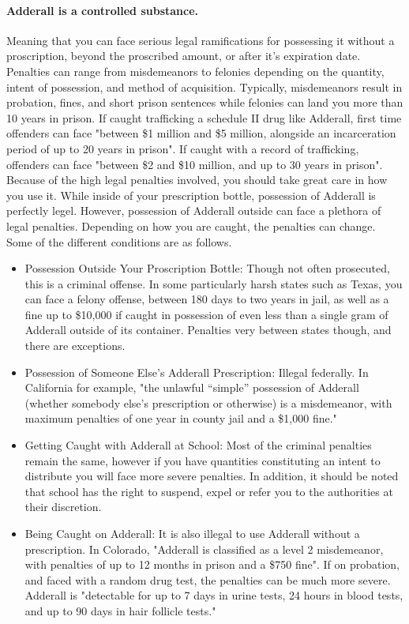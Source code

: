 \documentclass{article}
\begin{document}
                \paragraph{Adderall is a controlled substance.} Meaning that you can face serious legal ramifications for possessing it without a proscription, beyond the proscribed amount, or after it's expiration date. Penalties can range from misdemeanors to felonies depending on the quantity, intent of possession, and method of acquisition. Typically, misdemeanors result in probation, fines, and short prison sentences while felonies can land you more than 10 years in prison. If caught trafficking a schedule II drug like Adderall, first time offenders can face "between \$1 million and \$5 million, alongside an incarceration period of up to 20 years in prison"\cite{hindin22}. If caught with a record of trafficking, offenders can face "between \$2 and \$10 million, and up to 30 years in prison"\cite{hindin22}. Because of the high legal penalties involved, you should take great care in how you use it. 
                While inside of your prescription bottle, possession of Adderall is perfectly legel. However, possession of Adderall outside can face a plethora of legal penalties. Depending on how you are caught, the penalties can change. Some of the different conditions are as follows.
                \begin{itemize}
                    \item Possession Outside Your Proscription Bottle: Though not often prosecuted, this is a criminal offense. In some particularly harsh states such as Texas, you can face a felony offense, between 180 days to two years in jail, as well as a fine up to \$10,000 if caught in possession of even less than a single gram of Adderall outside of its container. Penalties very between states though, and there are exceptions.
                    \item Possession of Someone Else’s Adderall Prescription: Illegal federally. In California for example, "the unlawful “simple” possession of Adderall (whether somebody else’s prescription or otherwise) is a misdemeanor, with maximum penalties of one year in county jail and a \$1,000 fine."\cite{hindin22}
                    \item Getting Caught with Adderall at School: Most of the criminal penalties remain the same, however if you have quantities constituting an intent to distribute you will face more severe penalties. In addition, it should be noted that school has the right to suspend, expel or refer you to the authorities at their discretion.
                    \item Being Caught on Adderall: It is also illegal to use Adderall without a prescription. In Colorado, "Adderall is classified as a level 2 misdemeanor, with penalties of up to 12 months in prison and a \$750 fine"\cite{hindin22}. If on probation, and faced with a random drug test, the penalties can be much more severe. Adderall is "detectable for up to 7 days in urine tests, 24 hours in blood tests, and up to 90 days in hair follicle tests."\cite{hindin22}
                \end{itemize}
\end{document}

